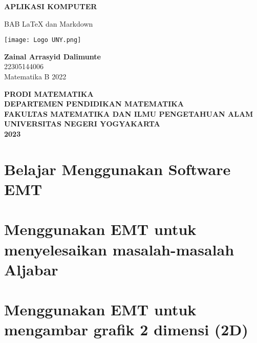 \documentclass{report}
\begin{document}
\begin{titlepage}
    \begin{center}
        \vspace*{0,2cm}

        \Large
        \textbf{\huge APLIKASI KOMPUTER}
        
        \vspace{1cm}
        
        \LARGE
        BAB LaTeX dan Markdown  
        
        \vspace{1cm}
        
        \texttt{[image: Logo UNY.png]}

        \vspace{1cm}
        
        \textbf{Zainal Arrasyid Dalimunte}\\
        22305144006\\
        Matematika B 2022
        
        \vspace{2cm}
        
        \Large
        \textbf{PRODI MATEMATIKA}\\
        \textbf{DEPARTEMEN PENDIDIKAN MATEMATIKA}\\
        \textbf{FAKULTAS MATEMATIKA DAN ILMU PENGETAHUAN ALAM}
        \textbf{UNIVERSITAS NEGERI YOGYAKARTA}\\
        \textbf{2023}
        
    \end{center}
\end{titlepage}

\newpage
\tableofcontents

\chapter{\Large Belajar Menggunakan Software EMT}


\newpage
\chapter{\Large Menggunakan EMT untuk menyelesaikan masalah-masalah Aljabar}


\newpage
\chapter{\Large Menggunakan EMT untuk mengambar grafik 2 dimensi (2D)}

\end{document}
